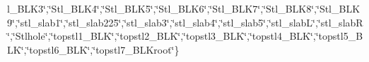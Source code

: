 \begin{DoxyCompactItemize}
l\-\_\-\-B\-L\-K3\char`\"{},\char`\"{}Stl\-\_\-\-B\-L\-K4\char`\"{},\char`\"{}Stl\-\_\-\-B\-L\-K5\char`\"{},\char`\"{}Stl\-\_\-\-B\-L\-K6\char`\"{},\char`\"{}Stl\-\_\-\-B\-L\-K7\char`\"{},\char`\"{}Stl\-\_\-\-B\-L\-K8\char`\"{},\char`\"{}Stl\-\_\-\-B\-L\-K9\char`\"{},\char`\"{}stl\-\_\-slab1\char`\"{},\char`\"{}stl\-\_\-slab225\char`\"{},\char`\"{}stl\-\_\-slab3\char`\"{},\char`\"{}stl\-\_\-slab4\char`\"{},\char`\"{}stl\-\_\-slab5\char`\"{},\char`\"{}stl\-\_\-slab\-L\char`\"{},\char`\"{}stl\-\_\-slab\-R\char`\"{},\char`\"{}Stlhole\char`\"{},\char`\"{}topstl1\-\_\-\-B\-L\-K\char`\"{},\char`\"{}topstl2\-\_\-\-B\-L\-K\char`\"{},\char`\"{}topstl3\-\_\-\-B\-L\-K\char`\"{},\char`\"{}topstl4\-\_\-\-B\-L\-K\char`\"{},\char`\"{}topstl5\-\_\-\-B\-L\-K\char`\"{},\char`\"{}topstl6\-\_\-\-B\-L\-K\char`\"{},\char`\"{}topstl7\-\_\-\-B\-L\-Kroot\char`\"{}\}
\end{DoxyCompactItemize}


